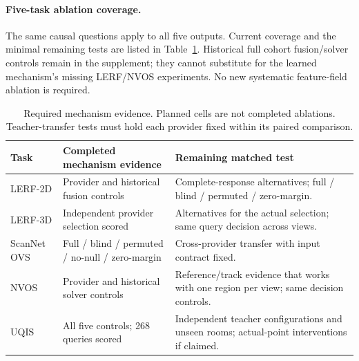 \paragraph{Five-task ablation coverage.}
The same causal questions apply to all five outputs. Current coverage and the
minimal remaining tests are listed in Table~\ref{tab:coverage}. Historical full
cohort fusion/solver controls remain in the supplement; they cannot substitute
for the learned mechanism's missing LERF/NVOS experiments. No new systematic
feature-field ablation is required.
\begin{table}[ht]
\centering\small
\begin{tabular}{lp{.25\linewidth}p{.41\linewidth}}
\toprule
Task & Completed mechanism evidence & Remaining matched test \\
\midrule
LERF-2D & Provider and historical fusion controls & Complete-response alternatives; full / blind / permuted / zero-margin. \\
LERF-3D & Independent provider selection scored & Alternatives for the actual selection; same query decision across views. \\
ScanNet OVS & Full / blind / permuted / no-null / zero-margin & Cross-provider transfer with input contract fixed. \\
NVOS & Provider and historical solver controls & Reference/track evidence that works with one region per view; same decision controls. \\
UQIS & All five controls; 268 queries scored & Independent teacher configurations and unseen rooms; actual-point interventions if claimed. \\
\bottomrule
\end{tabular}
\caption{Required mechanism evidence. Planned cells are not completed ablations.
Teacher-transfer tests must hold each provider fixed within its paired comparison.}
\label{tab:coverage}
\end{table}
